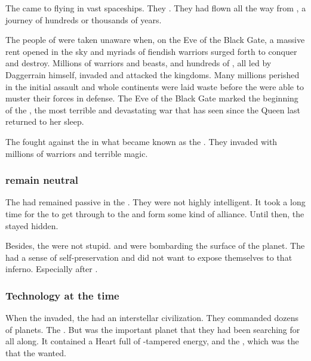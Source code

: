 The \banes{} came to \Miith{} flying in vast spaceships. They . 
They had flown all the way from \Erebos{}, a journey of hundreds or thousands of years. 

The people of \Miith{} were taken unaware when, on the Eve of the Black Gate, a massive rent opened in the sky and myriads of fiendish \bane{} warriors surged forth to conquer and destroy. 
Millions of \bane{} warriors and beasts, and hundreds of \banelords, all led by Daggerrain himself, invaded and attacked the \draconic{} kingdoms. 
Many millions perished in the initial assault and whole continents were laid waste before the \ophidians{} were able to muster their forces in defense. 
The Eve of the Black Gate marked the beginning of the \Banewar, the most terrible and devastating war that \Miith{} has seen since the \Kraken{} Queen last returned to her sleep. 

The \banes{} fought against the \ophidians{} in what became known as the \firstbanewar. 
They invaded with millions of \bane{} warriors and terrible magic. 





\subsubsection{\Noggyaleth remain neutral}
The \noggyaleth had remained passive in the \firstbanewar. 
They were not highly intelligent. 
It took a long time for the \banes to get through to the \noggyaleth and form some kind of alliance. 
Until then, the \noggyaleth stayed hidden. 

Besides, the \noggyaleth were not stupid.
\Banes and \ophidians were bombarding the surface of the planet.
The \noggyaleth had a sense of self-preservation and did not want to expose themselves to that inferno.
Especially after . 






\subsubsection{Technology at the time}
When the \banes invaded, the \ophidians had an interstellar civilization.
They commanded dozens of planets. 
The \banes {}. 
But \Miith was the important planet that they had been searching for all along. 
It contained a Heart full of \voyager-tampered energy, and the \noggyal {}, which was the  that the \banes wanted. 

